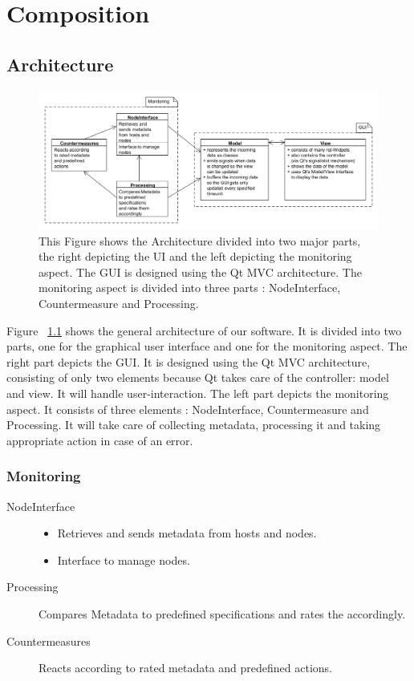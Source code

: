 \chapter{Composition}

\section{Architecture}

\begin{figure}[here]
\includegraphics[width=\linewidth]{./bilder/architektur.png}
\caption{This Figure shows the Architecture divided into two major parts, the right depicting the UI and the left depicting the monitoring aspect. The GUI is designed using the Qt MVC architecture. The monitoring aspect is divided into three parts : NodeInterface, Countermeasure and Processing.}
\label{fig:architecture}
\end{figure}

Figure ~\ref{fig:architecture} shows the general architecture of our software. It is divided into two parts, one for the graphical user interface and one for the monitoring aspect.
The right part depicts the GUI. It is designed using the Qt MVC architecture, consisting of only two elements because Qt takes care of the controller: model and view. It will handle user-interaction.
The left part depicts the monitoring aspect. It consists of three elements : NodeInterface, Countermeasure and Processing. It will take care of collecting metadata, processing it and taking appropriate action in case of an error.

\subsection{Monitoring}

\begin{description}
	\item[NodeInterface] \mbox{}
		\begin{itemize}
			\item Retrieves and sends metadata from hosts and nodes.
			\item Interface to manage nodes.
		\end{itemize}
	\item[Processing] \mbox{} 
	Compares Metadata to predefined specifications and
	rates the accordingly.
	\item[Countermeasures] \mbox{} 
	Reacts according to rated metadata and
	predefined actions.
\end{description}

